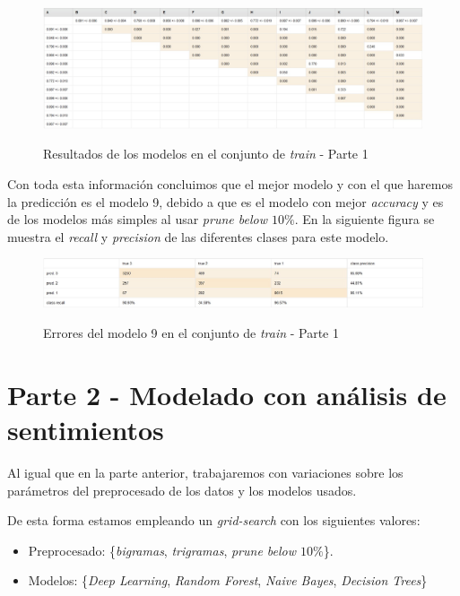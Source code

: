 \documentclass[12pt]{report} %
\begin{document}
    \begin{figure}[H]
        \includegraphics[width=\linewidth]{t_test1.jpeg}\\ 
        \caption{Resultados de los modelos en el conjunto de \textit{train} - Parte 1}
    \end{figure}

    Con toda esta información concluimos que el mejor modelo y con el que haremos
    la predicción es el modelo 9, debido a que es el modelo con mejor
    \textit{accuracy} y es de los modelos más simples al usar \textit{prune below $10\%$}.
    En la siguiente figura se muestra el \textit{recall} y \textit{precision}
    de las diferentes clases para este modelo.

    \begin{figure}[H]
        \includegraphics[width=\linewidth]{train1.jpeg}\\ 
        \caption{Errores del modelo 9 en el conjunto de \textit{train} - Parte 1}
    \end{figure}

\section{Parte 2 - Modelado con análisis de sentimientos}
\label{sec:parte2}

    Al igual que en la parte anterior, trabajaremos con variaciones
    sobre los parámetros del preprocesado de los datos y los modelos usados.

    De esta forma estamos empleando un \textit{grid-search} con los siguientes valores:
    \begin{itemize}
        \item Preprocesado: \{\textit{bigramas}, \textit{trigramas}, \textit{prune below $10\%$}\}.
        \item Modelos: \{\textit{Deep Learning}, \textit{Random Forest}, \textit{Naive Bayes}, \textit{Decision Trees}\}
    \end{itemize}
\end{document}
